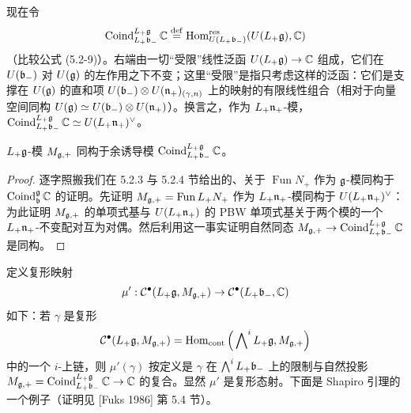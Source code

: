 现在令
\[
\operatorname{Coind}_{L_+\mathfrak{b}_-}^{L_+\mathfrak{g}}\mathbb{C} \overset{\mathrm{def}}{=}\operatorname{Hom}^{\mathrm{res}}_{U(L_+\mathfrak{b}_-)}(U(L_+\mathfrak{g}),\mathbb{C})
\]
（比较公式 (5.2-9)）。右端由一切“受限”线性泛函 $U(L_+\mathfrak{g})\to\mathbb{C}$ 组成，它们在 $U(\mathfrak{b}_-)$ 对 $U(\mathfrak{g})$ 的左作用之下不变；这里“受限”是指只考虑这样的泛函：它们是支撑在 $U(\mathfrak{g})$ 的直和项 $U(\mathfrak{b}_-)\otimes U(\mathfrak{n}_+){}_{(\gamma,n)}$ 上的映射的有限线性组合（相对于向量空间同构 $U(\mathfrak{g})\simeq U(\mathfrak{b}_-)\otimes U(\mathfrak{n}_+)$）。换言之，作为 $L_+\mathfrak{n}_+$-模，$\operatorname{Coind}_{L_+\mathfrak{b}_-}^{L_+\mathfrak{g}}\mathbb{C}\simeq U(L_+\mathfrak{n}_+)^\vee$。


\begin{lemma}
$L_+\mathfrak{g}$-模 $M_{\mathfrak{g},+}$ 同构于余诱导模 $\operatorname{Coind}_{L_+\mathfrak{b}_-}^{L_+\mathfrak{g}}\mathbb{C}$。
\end{lemma}

\begin{proof}
逐字照搬我们在 5.2.3 与 5.2.4 节给出的、关于 $\operatorname{Fun}N_+$ 作为 $\mathfrak{g}$-模同构于 $\operatorname{Coind}_{\mathfrak{b}}^{\mathfrak{g}}\mathbb{C}$ 的证明。先证明 $M_{\mathfrak{g},+} = \operatorname{Fun}L_+N_+$ 作为 $L_+\mathfrak{n}_+$-模同构于 $U(L_+\mathfrak{n}_+)^\vee$：为此证明 $M_{\mathfrak{g},+}$ 的单项式基与 $U(L_+\mathfrak{n}_+)$ 的 PBW 单项式基关于两个模的一个 $L_+\mathfrak{n}_+$-不变配对互为对偶。然后利用这一事实证明自然同态 $M_{\mathfrak{g},+}\to\operatorname{Coind}_{L_+\mathfrak{b}_-}^{L_+\mathfrak{g}}\mathbb{C}$ 是同构。
\end{proof}

定义复形映射
\[
\mu':\mathcal{C}^\bullet(L_+\mathfrak{g},M_{\mathfrak{g},+})\to\mathcal{C}^\bullet(L_+\mathfrak{b}_-,\mathbb{C})
\]
如下：若 $\gamma$ 是复形
\[
\mathcal{C}^\bullet(L_+\mathfrak{g},M_{\mathfrak{g},+}) = \operatorname{Hom}_{\mathrm{cont}}\Big(\bigwedge\nolimits^i L_+\mathfrak{g},M_{\mathfrak{g},+}\Big)
\]
中的一个 $i$-上链，则 $\mu'(\gamma)$ 按定义是 $\gamma$ 在 $\bigwedge^i L_+\mathfrak{b}_-$ 上的限制与自然投影 $M_{\mathfrak{g},+} = \operatorname{Coind}_{L_+\mathfrak{b}_-}^{L_+\mathfrak{g}}\mathbb{C}\to\mathbb{C}$ 的复合。显然 $\mu'$ 是复形态射。下面是 Shapiro 引理的一个例子（证明见 [Fuks 1986] 第 5.4 节）。


